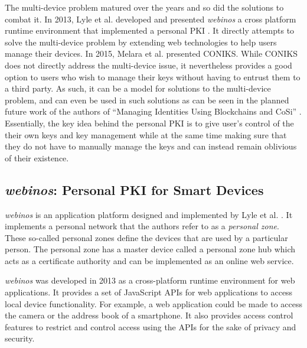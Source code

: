 The multi-device problem matured over the years and so did the solutions to combat it. In 2013, Lyle et al. developed and presented \textit{webinos} a cross platform runtime environment that implemented a personal PKI \cite{Lyle2013}. It directly attempts to solve the multi-device problem by extending web technologies to help users manage their devices. In 2015, Melara et al. presented CONIKS. While CONIKS does not directly address the multi-device issue, it nevertheless provides a good option to users who wish to manage their keys without having to entrust them to a third party. As such, it can be a model for solutions to the multi-device problem, and can even be used in such solutions as can be seen in the planned future work of the authors of ``Managing Identities Using Blockchains and CoSi'' \cite{Kokoris-kogias}. Essentially, the key idea behind the personal PKI is to give user's control of the their own keys and key management while at the same time making sure that they do not have to manually manage the keys and can instead remain oblivious of their existence.




\subsection{\emph{webinos}: Personal PKI for Smart Devices}

\textit{webinos} is an application platform designed and implemented by Lyle et al. \cite{Lyle2013}. It implements a personal network that the authors refer to as a \textit{personal zone}. These so-called personal zones define the devices that are used by a particular person. The personal zone has a master device called a personal zone hub which acts as a certificate authority and can be implemented as an online web service.

\textit{webinos} was developed in 2013 as a cross-platform runtime environment for web applications. It provides a set of JavaScript APIs for web applications to access local device functionality. For example, a web application could be made to access the camera or the address book of a smartphone. It also provides access control features to restrict and control access using the APIs for the sake of privacy and security.

